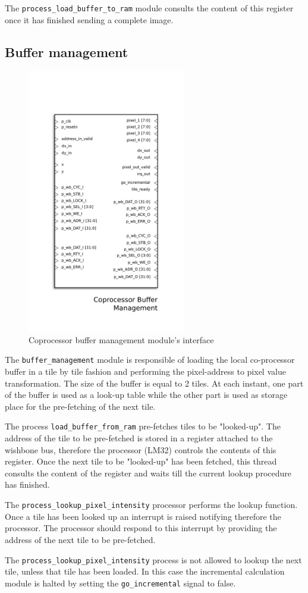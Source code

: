 The \texttt{process\_load\_buffer\_to\_ram} module consults the content of this register once it has finished sending a complete image.

\subsection{Buffer management}

\begin{figure}[H]
\center
\includegraphics[width=6.9cm]{figs/Buffer_management.pdf}
\caption{Coprocessor buffer management module's interface}
\label{buff_out_ports}
\end{figure}


The \texttt{buffer\_management} module is responsible of loading the local co-processor buffer in a tile by tile fashion and performing the pixel-address to pixel value transformation. The size of the buffer is equal to 2 tiles. At each instant, one part of the buffer is used as a look-up table while the other part is used as storage place for the pre-fetching of the next tile. 

The process \texttt{load\_buffer\_from\_ram} pre-fetches tiles  to be "looked-up". The address of the tile to be pre-fetched is stored in a register attached to the wishbone bus, therefore the processor (LM32) controls the contents of this register. Once the next tile to be "looked-up" has been fetched, this thread consults the content of the register and waits till the current lookup procedure has finished. 

The  \texttt{process\_lookup\_pixel\_intensity}  processor performs the lookup function. Once a tile has been looked up an interrupt is raised notifying therefore the processor. The processor should respond to this interrupt by providing the address of the next tile to be pre-fetched. 

The \texttt{process\_lookup\_pixel\_intensity} process is not allowed to lookup the next tile, unless that tile has been loaded. In this case the incremental calculation module is halted by setting the \texttt{go\_incremental} signal to false.  
